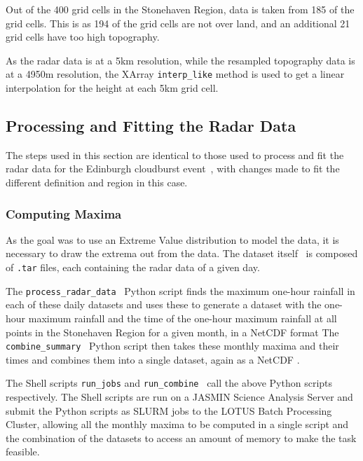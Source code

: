 Out of the 400 grid cells in the Stonehaven Region,
    data is taken from 185 of the grid cells.
This is as 194 of the grid cells are not over land,
    and an additional 21 grid cells have too high topography.

As the radar data is at a 5km resolution,
    while the resampled topography data is at a 4950m resolution,
    the XArray \texttt{interp\_like} method is used to get a linear interpolation for the height at each 5km grid cell.

\subsection{Processing and Fitting the Radar Data}\label{subsec:radarprocess}

The steps used in this section are identical to those used to process and fit the radar data for the Edinburgh cloudburst event~\cite{Tett_Soon},
    with changes made to fit the different definition and region in this case.

\subsubsection{Computing Maxima}

As the goal was to use an Extreme Value distribution to model the data,
    it is necessary to draw the extrema out from the data.
The dataset itself~\cite{radar_data} is composed of \texttt{.tar} files, each containing the radar data of a given day.

The \texttt{process\_radar\_data}~\cite{Me_Code} Python script finds the maximum one-hour rainfall in each of these daily datasets and
    uses these to generate a dataset with the one-hour maximum rainfall and the time of the one-hour maximum rainfall
    at all points in the Stonehaven Region for a given month, in a NetCDF format
The \texttt{combine\_summary}~\cite{Me_Code} Python script then takes these monthly maxima and their times and combines them into a single dataset,
    again as a NetCDF .

The Shell scripts \texttt{run\_jobs} and \texttt{run\_combine}~\cite{Me_Code} call the above Python scripts respectively.
The Shell scripts are run on a JASMIN Science Analysis Server and submit the Python scripts as SLURM jobs to the LOTUS Batch Processing Cluster,
    allowing all the monthly maxima to be computed in a single script and the combination of the datasets to access an amount of memory to make the task feasible.

